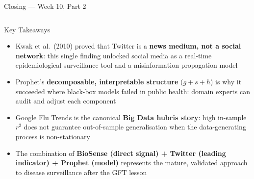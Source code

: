 \documentclass[aspectratio=169,10pt]{beamer}
\begin{document}
\begin{frame}{Closing — Week 10, Part 2}
  \begin{columns}[T]
      \begin{block}{Key Takeaways}
        \begin{itemize}
          \item Kwak et al.\ (2010) proved that Twitter is a
                \textbf{news medium, not a social network}:
                this single finding unlocked social media as a
                real-time epidemiological surveillance tool
                and a misinformation propagation model
          \item Prophet's \textbf{decomposable, interpretable structure}
                ($g + s + h$) is why it succeeded where black-box
                models failed in public health: domain experts can
                audit and adjust each component
          \item Google Flu Trends is the canonical
                \textbf{Big Data hubris story}: high in-sample
                $r^2$ does not guarantee out-of-sample generalisation
                when the data-generating process is non-stationary
          \item The combination of \textbf{BioSense (direct signal)
                + Twitter (leading indicator) + Prophet (model)}
                represents the mature, validated approach to
                disease surveillance after the GFT lesson
        \end{itemize}
      \end{block}


\end{columns}
\end{frame}
\end{document}
